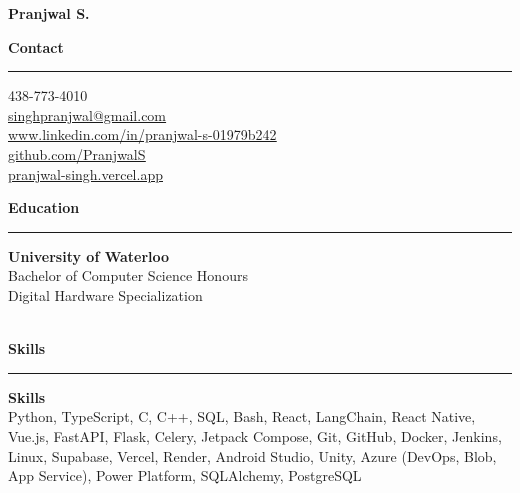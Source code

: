 \documentclass[10pt]{article}
\newcommand{\cvsection}[1]{
  \vspace{6pt}
  {\large\bf #1}
  \vspace{2pt}
  \hrule
  \vspace{5pt}
}
\newcommand{\tagged}[2]{\hypertarget{#1}{#2}}
\begin{document}
\noindent
{}
\vspace{-0.5cm}
\begin{center}
  {\LARGE\bf\color{white} \tagged{contact_name}{Pranjwal S.}}
\end{center}
\vspace{0.4cm}

\noindent
\begin{minipage}[t]{0.28\textwidth}
\vspace{0pt}
\hspace{6pt}
\begin{minipage}[t]{\dimexpr\textwidth-6pt}

\cvsection{Contact}
{\fontsize{8.5}{12}\selectfont
\tagged{contact_phone}{438-773-4010} \\[2pt]
\underline{\href{mailto:singhpranjwal@gmail.com}{\tagged{contact_email}{singhpranjwal@gmail.com}}} \\[2pt]
\underline{\href{https://www.linkedin.com/in/pranjwal-s-01979b242/}{\tagged{contact_linkedin}{www.linkedin.com/in/pranjwal-s-01979b242}}} \\[2pt]
\underline{\href{https://github.com/PranjwalS}{\tagged{contact_github}{github.com/PranjwalS}}} \\[2pt]
\underline{\href{https://pranjwal-singh.vercel.app}{\tagged{contact_portfolio}{pranjwal-singh.vercel.app}}}
}

\cvsection{Education}

{\fontsize{9.5}{13}\bf \tagged{66c6d9e1_school}{University of Waterloo}} \\[2pt]
{\fontsize{8.5}{11}\selectfont \tagged{66c6d9e1_degree}{Bachelor of Computer Science Honours}} \\[2pt]
{\fontsize{8}{10}\selectfont \tagged{66c6d9e1_field}{Digital Hardware Specialization}} \\[2pt]
{\fontsize{8}{10}\selectfont \tagged{66c6d9e1_location}{}} \\[2pt]
{\fontsize{8}{10}\selectfont \tagged{66c6d9e1_date}{}}
\vspace{6pt}


\cvsection{Skills}
{\fontsize{8}{12}\selectfont

{\bf \tagged{skill_0_label}{Skills}} \\[1pt]
\tagged{skill_0_value}{Python, TypeScript, C, C++, SQL, Bash, React, LangChain, React Native, Vue.js, FastAPI, Flask, Celery, Jetpack Compose, Git, GitHub, Docker, Jenkins, Linux, Supabase, Vercel, Render, Android Studio, Unity, Azure (DevOps, Blob, App Service), Power Platform, SQLAlchemy, PostgreSQL}
\vspace{5pt}

}

\end{minipage}
\end{minipage}%
\end{document}
